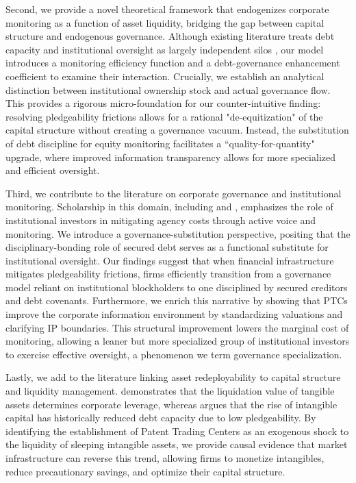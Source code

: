 \documentclass[12pt,a4paper]{article}
\begin{document}
Second, we provide a novel theoretical framework that endogenizes corporate monitoring as a function of asset liquidity, bridging the gap between capital structure and endogenous governance. Although existing literature treats debt capacity and institutional oversight as largely independent silos \citep{mann2018creditor}, our model introduces a monitoring efficiency function and a debt-governance enhancement coefficient to examine their interaction. Crucially, we establish an analytical distinction between institutional ownership stock and actual governance flow. This provides a rigorous micro-foundation for our counter-intuitive finding: resolving pledgeability frictions allows for a rational "de-equitization" of the capital structure without creating a governance vacuum. Instead, the substitution of debt discipline for equity monitoring facilitates a ``quality-for-quantity" upgrade, where improved information transparency allows for more specialized and efficient oversight.

Third, we contribute to the literature on corporate governance and institutional monitoring. Scholarship in this domain, including \cite{mccahery2016behind} and \cite{jahnke2019ownership}, emphasizes the role of institutional investors in mitigating agency costs through active voice and monitoring. We introduce a governance-substitution perspective, positing that the disciplinary-bonding role of secured debt serves as a functional substitute for institutional oversight. Our findings suggest that when financial infrastructure mitigates pledgeability frictions, firms efficiently transition from a governance model reliant on institutional blockholders to one disciplined by secured creditors and debt covenants. Furthermore, we enrich this narrative by showing that PTCs improve the corporate information environment by standardizing valuations and clarifying IP boundaries. This structural improvement lowers the marginal cost of monitoring, allowing a leaner but more specialized group of institutional investors to exercise effective oversight, a phenomenon we term governance specialization.

Lastly, we add to the literature linking asset redeployability to capital structure and liquidity management. \cite{campello2013real} demonstrates that the liquidation value of tangible assets determines corporate leverage, whereas \cite{falato2022rising} argues that the rise of intangible capital has historically reduced debt capacity due to low pledgeability. By identifying the establishment of Patent Trading Centers as an exogenous shock to the liquidity of sleeping intangible assets, we provide causal evidence that market infrastructure can reverse this trend, allowing firms to monetize intangibles, reduce precautionary savings, and optimize their capital structure.
\end{document}
